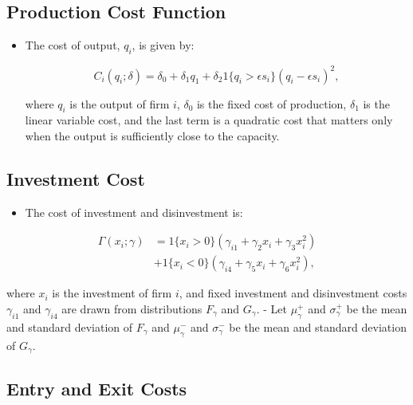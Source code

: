 \documentclass[]{book}
\providecommand{\tightlist}{%
  \setlength{\itemsep}{0pt}\setlength{\parskip}{0pt}}
\begin{document}
\subsection{Production Cost Function}\label{production-cost-function}

\begin{itemize}
\tightlist
\item
  The cost of output, \(q_i\), is given by:

  \begin{equation}
  C_i(q_i; \delta) = \delta_0 + \delta_1 q_1 + \delta_2 1\{q_i > \epsilon s_i\}(q_i - \epsilon s_i)^2,
  \end{equation}

  where \(q_i\) is the output of firm \(i\), \(\delta_0\) is the fixed
  cost of production, \(\delta_1\) is the linear variable cost, and the
  last term is a quadratic cost that matters only when the output is
  sufficiently close to the capacity.
\end{itemize}

\subsection{Investment Cost}\label{investment-cost}

\begin{itemize}
\tightlist
\item
  The cost of investment and disinvestment is:
\end{itemize}

\begin{equation}
\begin{split}
\Gamma(x_i; \gamma) &= 1\{x_i > 0\}(\gamma_{i1} + \gamma_2 x_i + \gamma_3 x_i^2)\\
& + 1\{x_i < 0\}(\gamma_{i4} + \gamma_{5} x_i + \gamma_6 x_i^2),
\end{split}
\end{equation}

where \(x_i\) is the investment of firm \(i\), and fixed investment and
disinvestment costs \(\gamma_{i1}\) and \(\gamma_{i4}\) are drawn from
distributions \(F_{\gamma}\) and \(G_{\gamma}\). - Let \(\mu_\gamma^+\)
and \(\sigma_\gamma^+\) be the mean and standard deviation of
\(F_\gamma\) and \(\mu_\gamma^-\) and \(\sigma_\gamma^-\) be the mean
and standard deviation of \(G_\gamma\).

\subsection{Entry and Exit Costs}\label{entry-and-exit-costs}
\end{document}

